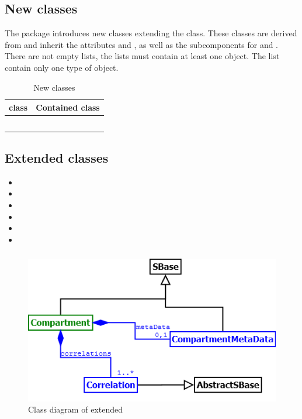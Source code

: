 \subsection{New \ListOf classes}
The \Pmf package introduces new classes extending the \ListOf class. These
classes are derived from \SBase and inherit the attributes  and
, as well as the subcomponents for \Annotation and \Notes. There
are not empty lists, the lists must contain at least one object. The list
contain only one type of object.

\begin{table}[h]
	\begin{tabular}{|l|l|}
		\hline
		\textbf{\ListOf class} & \textbf{Contained class}\\
		\hline
		\ListOfCorrelations & \Correlation\\
		\ListOfDataSources & \DataSource\\
		\ListOfModelVariables & \ModelVariable\\
		\ListOfPrimaryModels & \PrimaryModel\\
		\ListOfReferences & \Reference\\
		\hline
	\end{tabular}
	\caption{New \ListOf classes}
	\label{listof-classes}
\end{table}


\subsection{Extended classes}
\begin{itemize}
	\item \Compartment
	\item \Model
	\item \Parameter
	\item \Rule
	\item \Species
	\item \UnitDefinition
\end{itemize}

\subsubsection{}
\begin{figure}[h]
	\includegraphics[scale=0.8]{img/Compartment}
	\caption{Class diagram of extended \Compartment}
	\label{Compartment}
\end{figure}

